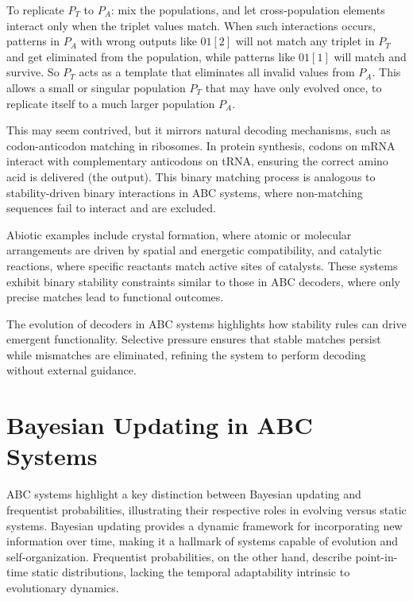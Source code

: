 \documentclass[entropy,article,submit,pdftex,moreauthors]{Definitions/mdpi}
\begin{document}
 To replicate \( P_T \) to \( P_A \): mix the populations, and let cross-population elements interact only when the triplet values match. When such interactions occurs, patterns in \( P_A \) with wrong outputs like \(01[2]\) will not match any triplet in \( P_T \) and get eliminated from the population, while patterns like \(01[1]\) will match and survive. So \( P_T \) acts as a template that eliminates all invalid values from \( P_A \). This  allows a small or singular population \( P_T \) that may have only evolved once, to replicate itself to a much larger population \( P_A \).

This may seem contrived, but it mirrors natural decoding mechanisms, such as codon-anticodon matching in ribosomes. In protein synthesis, codons on mRNA interact with complementary anticodons on tRNA, ensuring the correct amino acid is delivered (the output). This binary matching process is analogous to stability-driven binary interactions in ABC systems, where non-matching sequences fail to interact and are excluded.

Abiotic examples include crystal formation, where atomic or molecular arrangements are driven by spatial and energetic compatibility, and catalytic reactions, where specific reactants match active sites of catalysts. These systems exhibit binary stability constraints similar to those in ABC decoders, where only precise matches lead to functional outcomes.

The evolution of decoders in ABC systems highlights how stability rules can drive emergent functionality. Selective pressure ensures that stable matches persist while mismatches are eliminated, refining the system to perform decoding without external guidance.

\section{Bayesian Updating in ABC Systems}

ABC systems highlight a key distinction between Bayesian \cite{mcgrayne2011theory} updating and frequentist probabilities, illustrating their respective roles in evolving versus static systems. Bayesian updating provides a dynamic framework for incorporating new information over time, making it a hallmark of systems capable of evolution and self-organization. Frequentist probabilities, on the other hand, describe point-in-time static distributions, lacking the temporal adaptability intrinsic to evolutionary dynamics.
\end{document}
